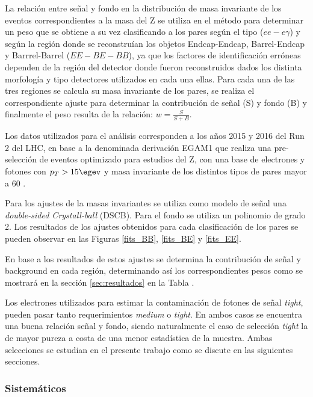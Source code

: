 La relación entre señal y fondo en la distribución de masa invariante de los eventos correspondientes a la masa del Z se utiliza en el método para determinar un peso que se obtiene a su vez clasificando a los pares según el tipo ($ee-e\gamma$) y según la región donde se reconstruían los objetos Endcap-Endcap, Barrel-Endcap y Barrrel-Barrel ($EE-BE-BB$), ya que los factores de identificación erróneas dependen de la región del detector donde fueron reconstruidos dados los distinta morfología y tipo detectores utilizados en cada una ellas. Para cada una de las tres regiones se calcula su masa invariante de los pares, se realiza el correspondiente ajuste para determinar la contribución de señal (S) y fondo (B) y finalmente el peso resulta de la relación: $w=\frac{S}{S+B}$. 

Los datos utilizados para el análisis corresponden a los años 2015 y 2016 del Run 2 del LHC, en base a la denominada derivación EGAM1 que realiza una pre-selección de eventos optimizado para estudios del Z, con una base de electrones y fotones con $p_{T} > 15 \egev$ y masa invariante de los distintos tipos de pares mayor a 60 \egev. %

Para los ajustes de la masas invariantes se utiliza como modelo de señal una \textit{double-sided Crystall-ball} (DSCB). Para el fondo se utiliza un polinomio de grado 2. Los resultados de los ajustes obtenidos para cada clasificación de los pares se pueden observar en las Figuras \ref{fits_BB}, \ref{fits_BE} y \ref{fits_EE}.


En base a los resultados de estos ajustes se determina la contribución de señal y background en cada región, determinando así los correspondientes pesos como se mostrará en la sección \ref{sec:resultados} en la Tabla \label{ta:fftable}.

Los electrones utilizados para estimar la contaminación de fotones de señal \textit{tight}, pueden pasar tanto requerimientos  \textit{medium} o \textit{tight}. En ambos casos se encuentra una buena relación señal y fondo, siendo naturalmente el caso de selección \textit{tight} la de mayor pureza a costa de una menor estadística de la muestra. Ambas selecciones se estudian en el presente trabajo como se discute en las siguientes secciones.


\subsubsection{Sistemáticos}

